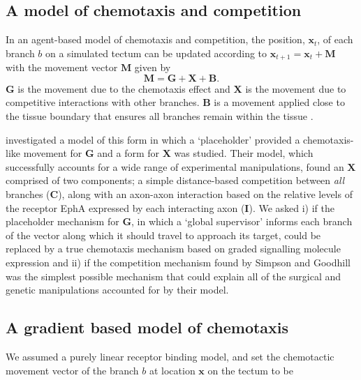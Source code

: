 \documentclass[11pt, a4paper]{article}
\begin{document}
\subsection*{A model of chemotaxis and competition}

In an agent-based model of chemotaxis and competition, the position, $\mathbf{x}_t$, of each branch $b$ on a simulated tectum can be updated according to $\mathbf{x}_{t+1} = \mathbf{x}_{t} + \mathbf{M}$ with the movement vector $\mathbf{M}$ given by
\begin{equation} \label{e:mv2}
 \mathbf{M} = \mathbf{G} +  \mathbf{X} + \mathbf{B}.
\end{equation}
$\mathbf{G}$ is the movement due to the chemotaxis effect and $\mathbf{X}$ is the movement due to competitive interactions with other branches.
$\mathbf{B}$ is a movement applied close to the tissue boundary that ensures all branches remain within the tissue \citep{holt_target_1998}.

\citet{simpson_simple_2011} investigated a model of this form in which a `placeholder' provided a chemotaxis-like movement for $\mathbf{G}$ and a form for $\mathbf{X}$ was studied.
Their model, which successfully accounts for a wide range of experimental manipulations, found an $\mathbf{X}$ comprised of two components; a simple distance-based competition between \emph{all} branches ($\mathbf{C}$), along with an axon-axon interaction based on the relative levels of the receptor EphA expressed by each interacting axon ($\mathbf{I}$).
We asked i) if the placeholder mechanism for $\mathbf{G}$, in which a `global supervisor' informs each branch of the vector along which it should travel to approach its target, could be replaced by a true chemotaxis mechanism based on graded signalling molecule expression and ii) if the competition mechanism found by Simpson and Goodhill was the simplest possible mechanism that could explain all of the surgical and genetic manipulations accounted for by their model.

\subsection*{A gradient based model of chemotaxis}

We assumed a purely linear receptor binding model, and set the chemotactic movement vector of the branch $b$ at location $\mathbf{x}$ on the tectum to be
\end{document}
